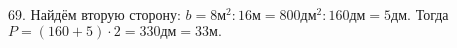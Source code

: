69. Найдём вторую сторону: $b=8\text{м}^2:16\text{м}=800\text{дм}^2:160\text{дм}=5\text{дм}.$ Тогда $P=(160+5)\cdot2=330\text{дм}=33\text{м}.$\\
